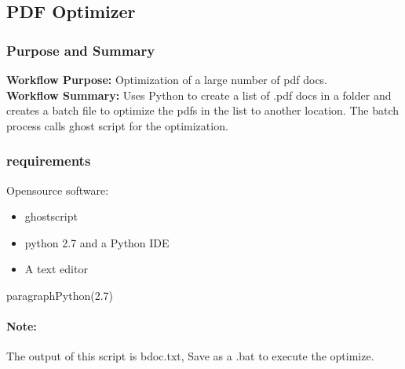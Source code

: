 %
%
%
%
% 
\subsection{PDF Optimizer}
\subsubsection{Purpose and Summary}
\textbf{Workflow Purpose:} Optimization of a large number of pdf docs.\\
\textbf{Workflow Summary:} Uses Python to create a list of .pdf docs in a folder and creates a batch file to optimize the pdfs in the list to another location.  The batch process calls ghost script for the optimization.

\subsubsection{requirements}
Opensource software:
\begin{itemize}
\item ghostscript
\item python 2.7 and a Python IDE
\item A text editor
\end{itemize}
paragraph{Python(2.7)}

\paragraph*{Note:} The output of this script is bdoc.txt, Save as a .bat to execute the optimize.

